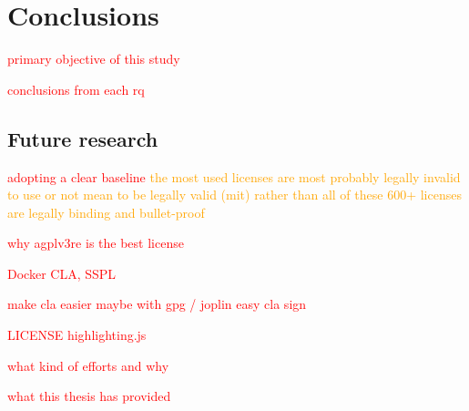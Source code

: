 \chapter{Conclusions\label{conclusions}}
\textcolor{red}{primary objective of this study}

\textcolor{red}{conclusions from each rq}


\section{Future research}
\textcolor{red}{adopting a clear baseline}
\textcolor{orange}{the most used licenses are most probably legally invalid to use or not mean to be legally valid (mit) rather than all of these 600+ licenses are legally binding and bullet-proof}

\textcolor{red}{why agplv3re is the best license}

\textcolor{red}{Docker CLA, SSPL}

\textcolor{red}{make cla easier maybe with gpg / joplin easy cla sign}

\textcolor{red}{LICENSE highlighting.js}

\textcolor{red}{what kind of efforts and why}

\textcolor{red}{what this thesis has provided}
